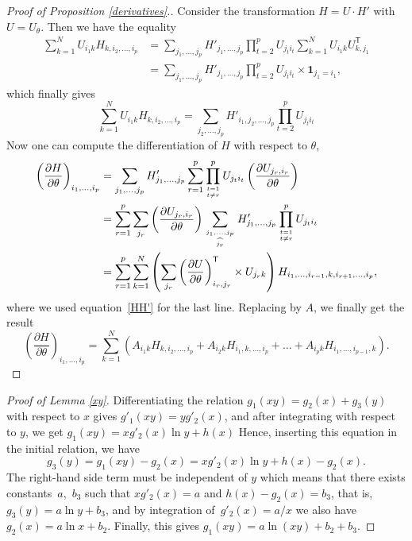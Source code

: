 \documentclass[pdftex]{sigma}
\numberwithin{equation}{section}
\theoremstyle{definition}
\begin{document}
\begin{proof}[Proof of Proposition \ref{derivatives}.]
Consider the transformation $H=U \cdot H'$ with $U=U_{\theta}$. Then we have the equality
\begin{align*}
    \sum_{k=1}^N U_{i_1k} H_{k,i_2,\dots,i_p} &= \sum_{j_1,\dots,j_p} H'_{j_1,\dots,j_p} \prod_{t=2}^p U_{j_ti_t} \sum_{k=1}^N U_{i_1k}U^{\mathsf T}_{k,j_1} \\
    &= \sum_{j_1,\dots,j_p} H'_{j_1,\dots,j_p} \prod_{t=2}^p U_{j_ti_t} \times \mathbf{1}_{j_1=i_1},
\end{align*}
which finally gives
\begin{equation}\label{HH'}
    \sum_{k=1}^N U_{i_1k} H_{k,i_2,\dots,i_p} = \sum_{j_2,\dots,j_p} H'_{i_1,j_2,\dots,j_p} \prod_{t=2}^p U_{j_ti_t}
\end{equation}
Now one can compute the differentiation of $H$ with respect to $\theta$,
\begin{align*}
    \left( \frac{\partial H}{\partial \theta} \right)_{i_1,\dots,i_p} &= \sum_{j_1,\dots,j_p} H'_{j_1,\dots,j_p} \sum_{r=1}^p \prod_{\genfrac{}{}{0pt}{}{t=1}{t\neq r}  }^p U_{j_ti_t} \left( \frac{\partial U_{j_r,i_r}}{\partial \theta} \right) \\
    &= \sum_{r=1}^p \sum_{j_r} \left( \frac{\partial U_{j_r,i_r}}{\partial \theta} \right) \sum_{ \genfrac{}{}{0pt}{}{j_1,\dots,j_p}{ \widehat{j_r}} } H'_{j_1,\dots,j_p} \prod_{\genfrac{}{}{0pt}{}{t=1}{t\neq r} }^p U_{j_ti_t} \\
    &= \sum_{r=1}^p \sum_{k=1}^N \left( \sum_{j_r} \left( \frac{\partial U}{\partial \theta} \right)^{\mathsf T}_{i_r,j_r} \times U_{j_rk} \right) H_{i_1,\dots,i_{r-1},k,i_{r+1},\dots,i_p},
\end{align*}
where we used equation~\eqref{HH'} for the last line. Replacing by $A$, we finally get the result
\[\left( \frac{\partial H}{\partial \theta} \right)_{i_1,\dots,i_p} = \sum_{k=1}^N (A_{i_1k}H_{k,i_2,\dots,i_p} + A_{i_2k}H_{i_1,k,\dots,i_p} + \dots + A_{i_pk}H_{i_1,\dots,i_{p-1},k}).\tag*{\qed}\]\renewcommand{\qed}{}
\end{proof}

\begin{proof}[Proof of Lemma \ref{xy}]
Differentiating the relation $g_1(xy)=g_2(x)+g_3(y)$ with respect to $x$ gives
$ g'_1(xy)=yg'_2(x)$,
and after integrating with respect to $y$, we get
$g_1(xy)=xg'_2(x)\ln y + h(x)$
Hence, inserting this equation in the initial relation, we have
\[ g_3(y) = g_1(xy)-g_2(x) = xg'_2(x)\ln y + h(x) - g_2(x).\]
The right-hand side term must be independent of $y$ which means that there exists constants~$a$,~$b_3$ such that $xg'_2(x)=a$ and $h(x) - g_2(x)=b_3$, that is,
$ g_3(y)=a \ln y + b_3$,
and by integration of~${g'_2(x)=a/x}$ we also have
$ g_2(x)=a \ln x + b_2$.
Finally, this gives $g_1(xy)=a \ln(xy) + b_2 + b_3$.
\end{proof}
\end{document}
